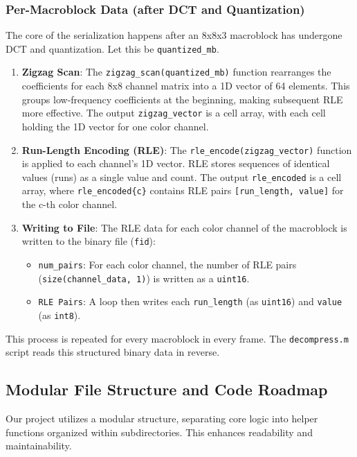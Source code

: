 \documentclass{article}
\begin{document}
\subsubsection{Per-Macroblock Data (after DCT and Quantization)}
The core of the serialization happens after an 8x8x3 macroblock has undergone DCT and quantization. Let this be \texttt{quantized\_mb}.
\begin{enumerate}
    \item \textbf{Zigzag Scan}: The \texttt{zigzag\_scan(quantized\_mb)} function rearranges the coefficients for each 8x8 channel matrix into a 1D vector of 64 elements. This groups low-frequency coefficients at the beginning, making subsequent RLE more effective. The output \texttt{zigzag\_vector} is a cell array, with each cell holding the 1D vector for one color channel.
    \item \textbf{Run-Length Encoding (RLE)}: The \texttt{rle\_encode(zigzag\_vector)} function is applied to each channel's 1D vector. RLE stores sequences of identical values (runs) as a single value and count. The output \texttt{rle\_encoded} is a cell array, where \texttt{rle\_encoded\{c\}} contains RLE pairs \texttt{[run\_length, value]} for the c-th color channel.
    \item \textbf{Writing to File}: The RLE data for each color channel of the macroblock is written to the binary file (\texttt{fid}):
    \begin{itemize}
        \item \texttt{num\_pairs}: For each color channel, the number of RLE pairs (\texttt{size(channel\_data, 1)}) is written as a \texttt{uint16}.
        \item \texttt{RLE Pairs}: A loop then writes each \texttt{run\_length} (as \texttt{uint16}) and \texttt{value} (as \texttt{int8}).
    \end{itemize}
\end{enumerate}
This process is repeated for every macroblock in every frame. The \texttt{decompress.m} script reads this structured binary data in reverse.

\subsection{Modular File Structure and Code Roadmap}
Our project utilizes a modular structure, separating core logic into helper functions organized within subdirectories. This enhances readability and maintainability.
\end{document}
